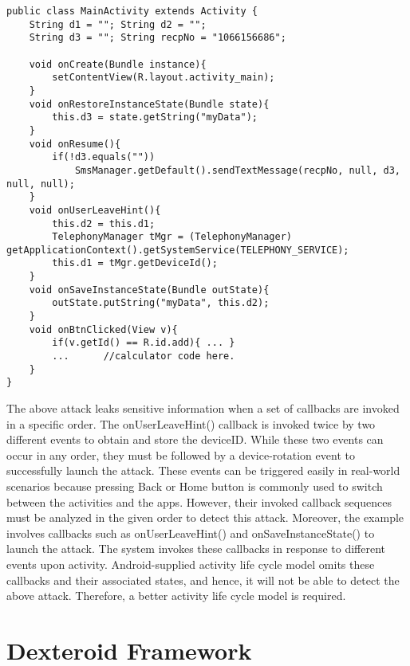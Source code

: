 \documentclass[10pt]{elsarticle}
\begin{document}
\noindent\begin{minipage}{14cm}  \begin{lstlisting}
public class MainActivity extends Activity {
	String d1 = ""; String d2 = ""; 
	String d3 = ""; String recpNo = "1066156686";

	void onCreate(Bundle instance){
		setContentView(R.layout.activity_main);
	}
	void onRestoreInstanceState(Bundle state){
		this.d3 = state.getString("myData");
	}
	void onResume(){
		if(!d3.equals(""))
			SmsManager.getDefault().sendTextMessage(recpNo, null, d3, null, null);
	}
	void onUserLeaveHint(){
		this.d2 = this.d1;
		TelephonyManager tMgr = (TelephonyManager) getApplicationContext().getSystemService(TELEPHONY_SERVICE);
		this.d1 = tMgr.getDeviceId();
	}
	void onSaveInstanceState(Bundle outState){
		outState.putString("myData", this.d2);
	}
	void onBtnClicked(View v){
		if(v.getId() == R.id.add){ ... }
		...      //calculator code here.
	}	
}
\end{lstlisting}
\end{minipage} 

The above attack leaks sensitive information when a set of callbacks are invoked in a specific order. The {\ttfamily onUserLeaveHint()} callback is invoked twice by two different events to obtain and store the deviceID. While these two events can occur in any order, they must be followed by a device-rotation event to successfully launch the attack. These events can be triggered easily in real-world scenarios because pressing Back or Home button is commonly used to switch between the activities and the apps. However, their invoked callback sequences must be analyzed in the given order to detect this attack. Moreover, the example involves callbacks such as {\ttfamily onUserLeaveHint()} and {\ttfamily onSaveInstanceState()} to launch the attack. The system invokes these callbacks in response to different events upon activity. Android-supplied activity life cycle model omits these callbacks and their associated states, and hence, it will not be able to detect the above attack. Therefore, a better activity life cycle model is required. 


\section{Dexteroid Framework}
\end{document}
